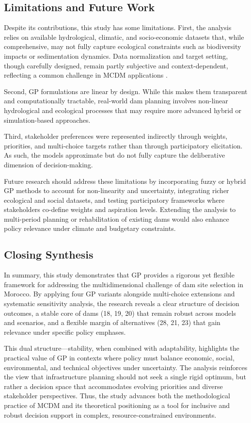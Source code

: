 \subsection{Limitations and Future Work}
Despite its contributions, this study has some limitations.  
First, the analysis relies on available hydrological, climatic, and socio-economic datasets that, while comprehensive, may not fully capture ecological constraints such as biodiversity impacts or sedimentation dynamics. Data normalization and target setting, though carefully designed, remain partly subjective and context-dependent, reflecting a common challenge in \gls{MCDM} applications \cite{Belton2002,Mardani2015}.  

Second, \gls{GP} formulations are linear by design. While this makes them transparent and computationally tractable, real-world dam planning involves non-linear hydrological and ecological processes that may require more advanced hybrid or simulation-based approaches.  

Third, stakeholder preferences were represented indirectly through weights, priorities, and multi-choice targets rather than through participatory elicitation. As such, the models approximate but do not fully capture the deliberative dimension of decision-making.  

Future research should address these limitations by incorporating fuzzy or hybrid \gls{GP} methods to account for non-linearity and uncertainty, integrating richer ecological and social datasets, and testing participatory frameworks where stakeholders co-define weights and aspiration levels. Extending the analysis to multi-period planning or rehabilitation of existing dams would also enhance policy relevance under climate and budgetary constraints.

\subsection{Closing Synthesis}
In summary, this study demonstrates that \gls{GP} provides a rigorous yet flexible framework for addressing the multidimensional challenge of dam site selection in Morocco. By applying four \gls{GP} variants alongside multi-choice extensions and systematic sensitivity analysis, the research reveals a clear structure of decision outcomes, a stable core of dams (18, 19, 20) that remain robust across models and scenarios, and a flexible margin of alternatives (28, 21, 23) that gain relevance under specific policy emphases.  

This dual structure—stability, when combined with adaptability, highlights the practical value of \gls{GP} in contexts where policy must balance economic, social, environmental, and technical objectives under uncertainty. The analysis reinforces the view that infrastructure planning should not seek a single rigid optimum, but rather a decision space that accommodates evolving priorities and diverse stakeholder perspectives. Thus, the study advances both the methodological practice of \gls{MCDM} and its theoretical positioning as a tool for inclusive and robust decision support in complex, resource-constrained environments.




